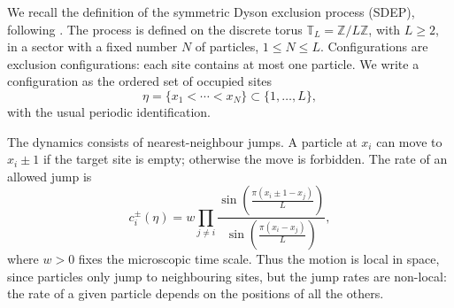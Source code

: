 \documentclass[11pt]{article}
\numberwithin{equation}{section}
\newcommand{\1}{\mathbf 1}
\begin{document}
We recall the definition of the symmetric Dyson exclusion process (SDEP), following
\cite{ZahraDubailSchutz2025}.  The process is defined on the discrete torus
\(\mathbb T_L=\mathbb Z/L\mathbb Z\), with \(L\geq2\), in a sector with a fixed
number \(N\) of particles, \(1\leq N\leq L\).  Configurations are exclusion
configurations: each site contains at most one particle.  We write a configuration
as the ordered set of occupied sites
\[
    \eta=\{x_1<\cdots<x_N\}\subset\{1,\ldots,L\},
\]
with the usual periodic identification.

The dynamics consists of nearest-neighbour jumps.  A particle at \(x_i\) can move
to \(x_i\pm1\) if the target site is empty; otherwise the move is forbidden.  The
rate of an allowed jump is
\begin{equation}
    c_i^{\pm}(\eta)
    =
    w
    \prod_{j\neq i}
    \frac{
    \sin\left(\frac{\pi(x_i\pm 1-x_j)}{L}\right)
    }{
    \sin\left(\frac{\pi(x_i-x_j)}{L}\right)
    },
    \label{eq:sdep_rate_right}
\end{equation}
where \(w>0\) fixes the microscopic time scale.  Thus the motion is local in
space, since particles only jump to neighbouring sites, but the jump rates are
non-local: the rate of a given particle depends on the positions of all the
others.
\end{document}
